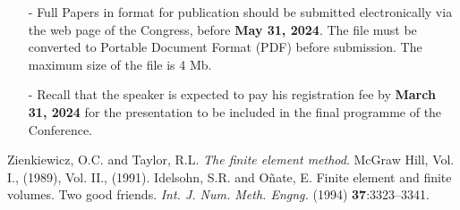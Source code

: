 \documentclass{wccm2024}
\begin{document}
\begin{itemize}
\item[-] Full Papers in format for publication should be submitted electronically via the web page of the Congress, before \textbf{May 31, 2024}. The file must be converted to Portable Document Format (PDF) before submission. The maximum size of the file is 4 Mb.

\item[-] Recall that the speaker is expected to pay his registration fee by \textbf{March 31, 2024} for the presentation to be included in the final programme of the Conference.
\end{itemize}

\begin{thebibliography}{99}
  Zienkiewicz, O.C. and  Taylor, R.L. \textit{The finite element method}. McGraw Hill,
Vol. I., (1989), Vol. II., (1991).
 Idelsohn, S.R. and O\~{n}ate, E. Finite element and finite volumes. Two good friends.
\textit{Int. J. Num. Meth. Engng.} (1994) \textbf{37}:3323--3341.
\end{thebibliography}
\end{document}
